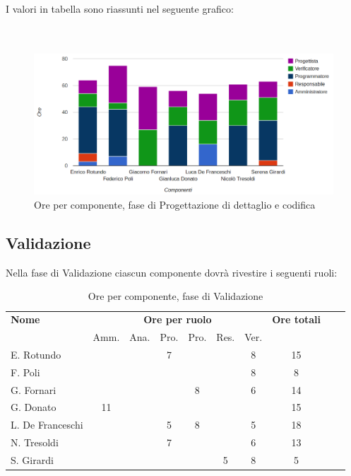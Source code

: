 I valori in tabella sono riassunti nel seguente grafico: \\ \\ \\

\begin{figure}[H]
\centering
\includegraphics[scale=0.35]{4-3.png}
\caption{Ore per componente, fase di Progettazione di dettaglio e codifica \label{fig:nome}}
\end{figure}

\subsection{Validazione}

Nella fase di Validazione ciascun componente dovrà rivestire i seguenti ruoli:

\begin{table}[H]
\centering
\begin{tabular}{lccccccccc}
\toprule 
    \textbf{Nome}  & \multicolumn{6}{c}{\textbf{Ore per ruolo}} & \textbf{Ore totali}\\
   	& Amm. & Ana. & Pro. & Pro. & Res. & Ver. \\
    \midrule
    E. Rotundo   	&   &  &	 7	&   &   & 8 & 15 \\
    F. Poli  		& 	&  &	 	&   &   & 8 & 8  \\
    G. Fornari		& 	&  &	 	& 8 &   & 6 & 14 \\
    G. Donato 		& 11	&  &	 	&   &   &   & 15 \\
    L. De Franceschi 	& 	&  &	 5	& 8 &   & 5 & 18 \\
    N. Tresoldi 		& 	&  &	 7	&   &   & 6 & 13 \\
    S. Girardi 		& 	&  &	 	&   & 5 & 8 & 5  \\
    
    \bottomrule
\end{tabular}
\caption{Ore per componente, fase di Validazione}
\end{table}


